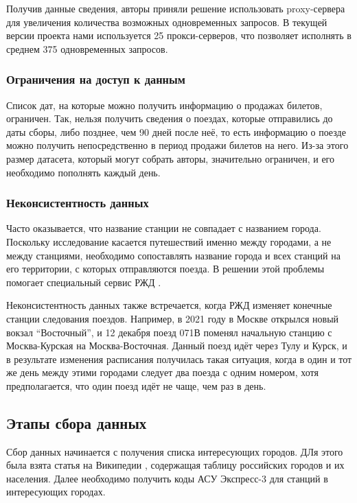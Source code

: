 \documentclass[conference]{IEEEtran}
\begin{document}
Получив данные сведения, авторы приняли решение использовать proxy-сервера для увеличения количества возможных одновременных запросов. В текущей версии проекта нами используется 25 прокси-серверов, что позволяет исполнять в среднем 375 одновременных запросов.

\subsubsection{Ограничения на доступ к данным}
Список дат, на которые можно получить информацию о продажах билетов, ограничен. Так, нельзя получить сведения о поездах, которые отправились до даты сборы, либо позднее, чем 90 дней после неё, то есть информацию о поезде можно получить непосредственно в период продажи билетов на него. Из-за этого размер датасета, который могут собрать авторы, значительно ограничен, и его необходимо пополнять каждый день.


\subsubsection{Неконсистентность данных}
Часто оказывается, что название станции не совпадает с названием города. Поскольку исследование касается путешествий именно между городами, а не между станциями, необходимо сопоставлять название города и всех станций на его территории, с которых отправляются поезда. В решении этой проблемы помогает специальный сервис РЖД %
. 

Неконсистентность данных также встречается, когда РЖД изменяет конечные станции следования поездов. Например, в 2021 году в Москве открылся новый вокзал ``Восточный'', и 12 декабря поезд 071В поменял начальную станцию с Москва-Курская на Москва-Восточная. Данный поезд идёт через Тулу и Курск, и в результате изменения расписания получилась такая ситуация, когда в один и тот же день между этими городами следует два поезда с одним номером, хотя предполагается, что один поезд идёт не чаще, чем раз в день.

\subsection{Этапы сбора данных}

Сбор данных начинается с получения списка интересующих городов. ДЛя этого была взята статья на Википедии %
, содержащая таблицу российских городов и их населения. Далее необходимо получить коды АСУ Экспресс-3 для станций в интересующих городах.
\end{document}
